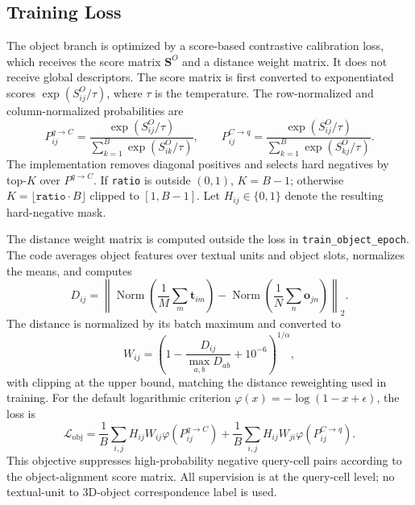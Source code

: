 \documentclass{article}
\begin{document}
\subsection{Training Loss}

The object branch is optimized by a score-based contrastive calibration loss, which receives the score matrix $\mathbf{S}^{O}$ and a distance weight matrix. It does not receive global descriptors. The score matrix is first converted to exponentiated scores $\exp(S_{ij}^{O}/\tau)$, where $\tau$ is the temperature. The row-normalized and column-normalized probabilities are
\begin{equation}
P_{ij}^{q\rightarrow C}=\frac{\exp(S_{ij}^{O}/\tau)}{\sum_{k=1}^{B}\exp(S_{ik}^{O}/\tau)},\qquad
P_{ij}^{C\rightarrow q}=\frac{\exp(S_{ij}^{O}/\tau)}{\sum_{k=1}^{B}\exp(S_{kj}^{O}/\tau)}.
\end{equation}
The implementation removes diagonal positives and selects hard negatives by top-$K$ over $P^{q\rightarrow C}$. If \texttt{ratio} is outside $(0,1)$, $K=B-1$; otherwise $K=\lfloor\texttt{ratio}\cdot B\rfloor$ clipped to $[1,B-1]$. Let $H_{ij}\in\{0,1\}$ denote the resulting hard-negative mask.

The distance weight matrix is computed outside the loss in \texttt{train\_object\_epoch}. The code averages object features over textual units and object slots, normalizes the means, and computes
\begin{equation}
D_{ij}=\left\|\operatorname{Norm}\left(\frac{1}{M}\sum_m\mathbf{t}_{im}\right)-\operatorname{Norm}\left(\frac{1}{N}\sum_n\mathbf{o}_{jn}\right)\right\|_2.
\end{equation}
The distance is normalized by its batch maximum and converted to
\begin{equation}
W_{ij}=\left(1-\frac{D_{ij}}{\max_{a,b}D_{ab}}+10^{-6}\right)^{1/\alpha},
\end{equation}
with clipping at the upper bound, matching the distance reweighting used in training. For the default logarithmic criterion $\varphi(x)=-\log(1-x+\epsilon)$, the loss is
\begin{equation}
\mathcal{L}_{\mathrm{obj}}=\frac{1}{B}\sum_{i,j}H_{ij}W_{ij}\varphi(P_{ij}^{q\rightarrow C})+\frac{1}{B}\sum_{i,j}H_{ij}W_{ji}\varphi(P_{ij}^{C\rightarrow q}).
\end{equation}
This objective suppresses high-probability negative query-cell pairs according to the object-alignment score matrix. All supervision is at the query-cell level; no textual-unit to 3D-object correspondence label is used.
\end{document}
